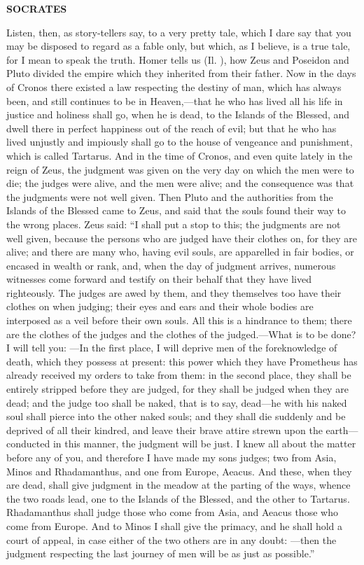 \documentclass[11pt,letter]{article}
\begin{document}
\par \textbf{SOCRATES}
\par   Listen, then, as story-tellers say, to a very pretty tale, which I dare say that you may be disposed to regard as a fable only, but which, as I believe, is a true tale, for I mean to speak the truth. Homer tells us (Il. ), how Zeus and Poseidon and Pluto divided the empire which they inherited from their father. Now in the days of Cronos there existed a law respecting the destiny of man, which has always been, and still continues to be in Heaven,—that he who has lived all his life in justice and holiness shall go, when he is dead, to the Islands of the Blessed, and dwell there in perfect happiness out of the reach of evil; but that he who has lived unjustly and impiously shall go to the house of vengeance and punishment, which is called Tartarus. And in the time of Cronos, and even quite lately in the reign of Zeus, the judgment was given on the very day on which the men were to die; the judges were alive, and the men were alive; and the consequence was that the judgments were not well given. Then Pluto and the authorities from the Islands of the Blessed came to Zeus, and said that the souls found their way to the wrong places. Zeus said:  “I shall put a stop to this; the judgments are not well given, because the persons who are judged have their clothes on, for they are alive; and there are many who, having evil souls, are apparelled in fair bodies, or encased in wealth or rank, and, when the day of judgment arrives, numerous witnesses come forward and testify on their behalf that they have lived righteously. The judges are awed by them, and they themselves too have their clothes on when judging; their eyes and ears and their whole bodies are interposed as a veil before their own souls. All this is a hindrance to them; there are the clothes of the judges and the clothes of the judged.—What is to be done? I will tell you: —In the first place, I will deprive men of the foreknowledge of death, which they possess at present:  this power which they have Prometheus has already received my orders to take from them:  in the second place, they shall be entirely stripped before they are judged, for they shall be judged when they are dead; and the judge too shall be naked, that is to say, dead—he with his naked soul shall pierce into the other naked souls; and they shall die suddenly and be deprived of all their kindred, and leave their brave attire strewn upon the earth—conducted in this manner, the judgment will be just. I knew all about the matter before any of you, and therefore I have made my sons judges; two from Asia, Minos and Rhadamanthus, and one from Europe, Aeacus. And these, when they are dead, shall give judgment in the meadow at the parting of the ways, whence the two roads lead, one to the Islands of the Blessed, and the other to Tartarus. Rhadamanthus shall judge those who come from Asia, and Aeacus those who come from Europe. And to Minos I shall give the primacy, and he shall hold a court of appeal, in case either of the two others are in any doubt: —then the judgment respecting the last journey of men will be as just as possible.”
\end{document}

